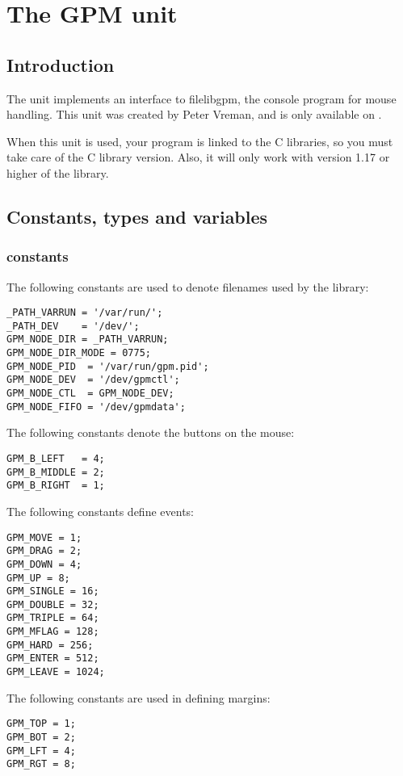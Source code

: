 \chapter{The GPM unit}

\section{Introduction}
The  unit implements an interface to file{libgpm}, the console
program for mouse handling. This unit was created by Peter Vreman, and 
is only available on \linux.

When this unit is used, your program is linked to the C libraries, so
you must take care of the C library version. Also, it will only work with
version 1.17 or higher of the  library.

\section{Constants, types and variables}
\subsection{constants}
The following constants are used to denote filenames used by the library:
\begin{verbatim}
_PATH_VARRUN = '/var/run/';
_PATH_DEV    = '/dev/';
GPM_NODE_DIR = _PATH_VARRUN;
GPM_NODE_DIR_MODE = 0775;
GPM_NODE_PID  = '/var/run/gpm.pid';
GPM_NODE_DEV  = '/dev/gpmctl';
GPM_NODE_CTL  = GPM_NODE_DEV;
GPM_NODE_FIFO = '/dev/gpmdata';
\end{verbatim}
The following constants denote the buttons on the mouse:
\begin{verbatim}
GPM_B_LEFT   = 4;
GPM_B_MIDDLE = 2;
GPM_B_RIGHT  = 1;
\end{verbatim}
The following constants define events:
\begin{verbatim}
GPM_MOVE = 1;      
GPM_DRAG = 2;
GPM_DOWN = 4;
GPM_UP = 8;
GPM_SINGLE = 16;
GPM_DOUBLE = 32;
GPM_TRIPLE = 64;
GPM_MFLAG = 128;
GPM_HARD = 256;
GPM_ENTER = 512;
GPM_LEAVE = 1024;
\end{verbatim}
The following constants are used in defining margins:
\begin{verbatim}
GPM_TOP = 1;
GPM_BOT = 2;
GPM_LFT = 4;
GPM_RGT = 8;
\end{verbatim}

